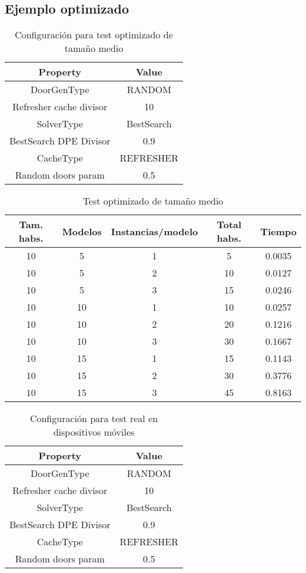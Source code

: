 \subsection{Ejemplo optimizado}

\begin{table}[H]
\begin{center}
	\begin{tabular}{ | c | c | }
\hline
 		Property & Value \\ \hline
DoorGenType & RANDOM \\ 
Refresher cache divisor & 10 \\ 
SolverType & BestSearch \\ 
BestSearch DPE Divisor & 0.9 \\ 
CacheType & REFRESHER \\ 
Random doors param & 0.5 \\ 
\hline
	\end{tabular}
\end{center}
\caption{Configuración para test optimizado de tamaño medio}
\label{table:cfg-bsoptmedsamp}
\end{table}

\begin{table}[H]
\begin{center}
	\begin{tabular}{ | c | c | c | c | c | }
\hline
Tam. habs. & Modelos & Instancias/modelo & Total habs. & Tiempo \\ \hline 
10 & 5 & 1 & 5 & 0.0035 \\ 
10 & 5 & 2 & 10 & 0.0127 \\ 
10 & 5 & 3 & 15 & 0.0246 \\ 
10 & 10 & 1 & 10 & 0.0257 \\ 
10 & 10 & 2 & 20 & 0.1216 \\ 
10 & 10 & 3 & 30 & 0.1667 \\ 
10 & 15 & 1 & 15 & 0.1143 \\ 
10 & 15 & 2 & 30 & 0.3776 \\ 
10 & 15 & 3 & 45 & 0.8163 \\ 
\hline
	\end{tabular}
\end{center}
\caption{Test optimizado de tamaño medio}
\label{table:bsoptmedsamp}
\end{table}


\begin{table}[H]
\begin{center}
	\begin{tabular}{ | c | c | }
\hline
 		Property & Value \\ \hline
DoorGenType & RANDOM \\ 
Refresher cache divisor & 10 \\ 
SolverType & BestSearch \\ 
BestSearch DPE Divisor & 0.9 \\ 
CacheType & REFRESHER \\ 
Random doors param & 0.5 \\ 
\hline
	\end{tabular}
\end{center}
\caption{Configuración para test real en dispositivos móviles}
\label{table:cfg-optreal}
\end{table}


